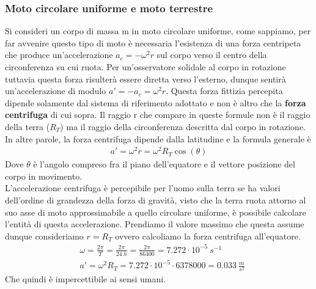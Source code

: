 \subsubsection*{Moto circolare uniforme e moto terrestre}
Si consideri un corpo di massa m in moto circolare uniforme, come sappiamo, per far avvenire questo tipo di moto è necessaria l'esistenza di una forza centripeta che produce un'accelerazione $a_c=-\omega^2r$ sul corpo verso il centro della circonferenza su cui ruota. Per un'osservatore solidale al corpo in rotazione tuttavia questa forza risulterà essere diretta verso l'esterno, dunque sentirà un'accelerazione di modulo $a'=-a_c=\omega^2r$. Questa forza fittizia percepita dipende solamente dal sistema di riferimento adottato e non è altro che la \textbf{forza centrifuga} di cui sopra. Il raggio r che compare in queste formule non è il raggio della terra ($R_T$) ma il raggio della circonferenza descritta dal corpo in rotazione. In altre parole, la forza centrifuga dipende dalla latitudine e la formula generale è
\begin{align*}
a'=\omega^2 r = \omega^2 R_T \cos(\theta)
\end{align*}
Dove $\theta$ è l'angolo compreso fra il piano dell'equatore e il vettore posizione del corpo in movimento.\\
L'accelerazione centrifuga è percepibile per l'uomo sulla terra se ha valori dell'ordine di grandezza della forza di gravità, visto che la terra ruota attorno al suo asse di moto approssimabile a quello circolare uniforme, è possibile calcolare l'entità di questa accelerazione. Prendiamo il valore massimo che questa assume dunque consideriamo $r = R_T$ ovvero calcoliamo la forza centrifuga all'equatore. 
\begin{align*}
	&\omega = \frac{2\pi}{T}= \frac{2\pi}{24\ h} = \frac{2\pi}{86400}= 7.272\cdot 10^{-5}\ s^{-1}\\
	&a'=\omega^2 R_T=7.272\cdot 10^{-5}\cdot 6378000 = 0.033\ \frac{m}{s^2}
\end{align*}
Che quindi è impercettibile ai sensi umani.
